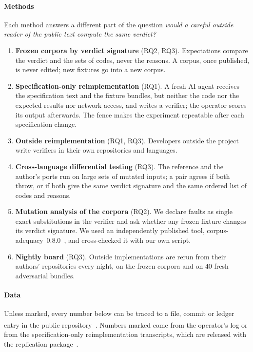 \documentclass[preprint,12pt,authoryear]{elsarticle}
\newcommand{\priv}{\textsuperscript{\textdagger}}
\begin{document}
\paragraph{Methods} Each method answers a different part of the question \emph{would a careful outside reader of the public text compute the same verdict?}
\begin{enumerate}[label=M\arabic*.]
\item \textbf{Frozen corpora by verdict signature} (RQ2, RQ3). Expectations compare the verdict and the sets of codes, never the reasons. A corpus, once published, is never edited; new fixtures go into a new corpus.
\item \textbf{Specification-only reimplementation} (RQ1). A fresh AI agent receives the specification text and the fixture bundles, but neither the code nor the expected results nor network access, and writes a verifier; the operator scores its output afterwards. The fence makes the experiment repeatable after each specification change.
\item \textbf{Outside reimplementation} (RQ1, RQ3). Developers outside the project write verifiers in their own repositories and languages.
\item \textbf{Cross-language differential testing} (RQ3). The reference and the author's ports run on large sets of mutated inputs; a pair agrees if both throw, or if both give the same verdict signature and the same ordered list of codes and reasons.
\item \textbf{Mutation analysis of the corpora} (RQ2). We declare faults as single exact substitutions in the verifier and ask whether any frozen fixture changes its verdict signature. We used an independently published tool, corpus-adequacy~0.8.0~\citep{corpusadequacy}, and cross-checked it with our own script.
\item \textbf{Nightly board} (RQ3). Outside implementations are rerun from their authors' repositories every night, on the frozen corpora and on 40 fresh adversarial bundles.
\end{enumerate}

\paragraph{Data} Unless marked, every number below can be traced to a file, commit or ledger entry in the public repository~\citep{repo}. Numbers marked \priv{} come from the operator's log or from the specification-only reimplementation transcripts, which are released with the replication package~\citep{replication}.
\end{document}
